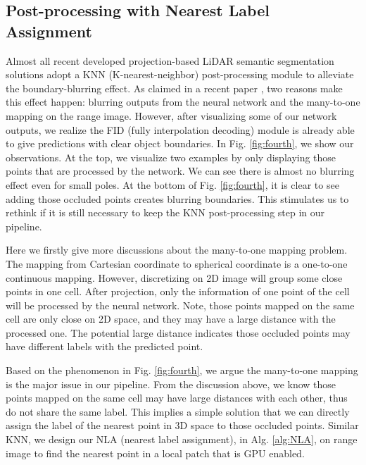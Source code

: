 \documentclass[letterpaper, 10 pt, conference]{ieeeconf}
\begin{document}
\subsection{Post-processing with Nearest Label Assignment}

Almost all recent developed projection-based LiDAR semantic segmentation solutions adopt a KNN (K-nearest-neighbor) post-processing module to alleviate the boundary-blurring effect. As claimed in a recent paper \cite{milioto2019rangenet++}, two reasons make this effect happen: blurring outputs from the neural network and the many-to-one mapping on the range image. However, after visualizing some of our network outputs, we realize the FID (fully interpolation decoding) module is already able to give predictions with clear object boundaries. In Fig. \ref{fig:fourth}, we show our observations. At the top, we visualize two examples by only displaying those points that are processed by the network. We can see there is almost no blurring effect even for small poles. At the bottom of Fig. \ref{fig:fourth}, it is clear to see adding those occluded points creates blurring boundaries. This stimulates us to rethink if it is still necessary to keep the KNN post-processing step in our pipeline.


Here we firstly give more discussions about the many-to-one mapping problem. The mapping from  Cartesian coordinate to  spherical coordinate is a one-to-one continuous mapping. However, discretizing  on 2D  image will group some close points in one cell. After projection, only the information of one point of the cell will be processed by the neural network. Note, those points mapped on the same cell are only close on 2D  space, and they may have a large distance with the processed one. The potential large distance indicates those occluded points may have different labels with the predicted point.

Based on the phenomenon in Fig. \ref{fig:fourth}, we argue the many-to-one mapping is the major issue in our pipeline. From the discussion above, we know those points mapped on the same cell may have large distances with each other, thus do not share the same label. This implies a simple solution that we can directly assign the label of the nearest point in 3D space to those occluded points. Similar KNN, we design our NLA (nearest label assignment), in Alg. \ref{alg:NLA}, on range image to find the nearest point in a local patch that is GPU enabled. 
\end{document}
